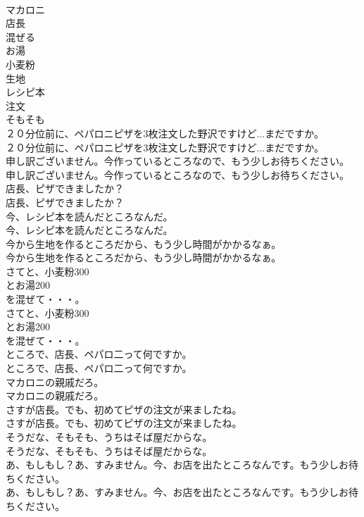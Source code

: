 \documentclass[8pt]{extreport}
\begin{document}
\begin{CJK}{UTF8}{min}
\\	マカロニ
\\	店長
\\	混ぜる
\\	お湯
\\	小麦粉
\\	生地
\\	レシピ本
\\	注文
\\	そもそも
\\	２０分位前に、ペパロニピザを3枚注文した野沢ですけど...まだですか。	
\\	２０分位前に、ペパロニピザを3枚注文した野沢ですけど...まだですか。 
\\	申し訳ございません。今作っているところなので、もう少しお待ちください。	
\\	申し訳ございません。今作っているところなので、もう少しお待ちください。 
\\	店長、ピザできましたか？	
\\	店長、ピザできましたか？ 
\\	今、レシピ本を読んだところなんだ。	
\\	今、レシピ本を読んだところなんだ。 
\\	今から生地を作るところだから、もう少し時間がかかるなぁ。	
\\	今から生地を作るところだから、もう少し時間がかかるなぁ。 
\\	さてと、小麦粉300
\\	とお湯200
\\	を混ぜて・・・。	
\\	さてと、小麦粉300
\\	とお湯200
\\	を混ぜて・・・。 
\\	ところで、店長、ペパロ二って何ですか。	
\\	ところで、店長、ペパロ二って何ですか。 
\\	マカロニの親戚だろ。	
\\	マカロニの親戚だろ。 
\\	さすが店長。でも、初めてピザの注文が来ましたね。	
\\	さすが店長。でも、初めてピザの注文が来ましたね。 
\\	そうだな、そもそも、うちはそば屋だからな。	
\\	そうだな、そもそも、うちはそば屋だからな。 
\\	あ、もしもし？あ、すみません。今、お店を出たところなんです。もう少しお待ちください。	
\\	あ、もしもし？あ、すみません。今、お店を出たところなんです。もう少しお待ちください。 

\end{CJK}
\end{document}
